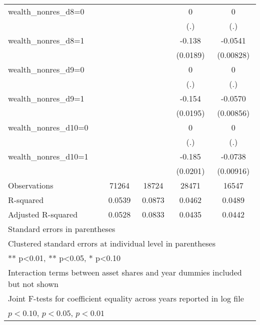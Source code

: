 \begin{table}[htbp]
\begin{tabular}{l*{4}{c}}
wealth\_nonres\_d8=0&                  &                  &        0         &        0         \\
                &                  &                  &      (.)         &      (.)         \\
\addlinespace
wealth\_nonres\_d8=1&                  &                  &   -0.138\sym{***}&  -0.0541\sym{***}\\
                &                  &                  & (0.0189)         &(0.00828)         \\
\addlinespace
wealth\_nonres\_d9=0&                  &                  &        0         &        0         \\
                &                  &                  &      (.)         &      (.)         \\
\addlinespace
wealth\_nonres\_d9=1&                  &                  &   -0.154\sym{***}&  -0.0570\sym{***}\\
                &                  &                  & (0.0195)         &(0.00856)         \\
\addlinespace
wealth\_nonres\_d10=0&                  &                  &        0         &        0         \\
                &                  &                  &      (.)         &      (.)         \\
\addlinespace
wealth\_nonres\_d10=1&                  &                  &   -0.185\sym{***}&  -0.0738\sym{***}\\
                &                  &                  & (0.0201)         &(0.00916)         \\
\midrule
Observations    &    71264         &    18724         &    28471         &    16547         \\
R-squared       &   0.0539         &   0.0873         &   0.0462         &   0.0489         \\
Adjusted R-squared&   0.0528         &   0.0833         &   0.0435         &   0.0442         \\
\bottomrule
\multicolumn{5}{l}{\footnotesize Standard errors in parentheses}\\
\multicolumn{5}{l}{\footnotesize Clustered standard errors at individual level in parentheses}\\
\multicolumn{5}{l}{\footnotesize *** p<0.01, ** p<0.05, * p<0.10}\\
\multicolumn{5}{l}{\footnotesize Interaction terms between asset shares and year dummies included but not shown}\\
\multicolumn{5}{l}{\footnotesize Joint F-tests for coefficient equality across years reported in log file}\\
\multicolumn{5}{l}{\footnotesize \sym{*} \(p<0.10\), \sym{**} \(p<0.05\), \sym{***} \(p<0.01\)}\\
\end{tabular}
\end{table}
